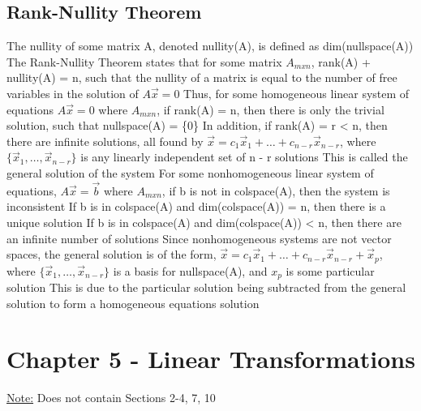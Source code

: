 \documentclass[11 pt, twoside]{article}
\newenvironment{outline*}
{
	\begin{outline}[enumerate]
	}
	{\end{outline}
}
\begin{document}
\subsection{Rank-Nullity Theorem}
\begin{outline*}
\1 The nullity of some matrix A, denoted nullity(A), is defined as dim(nullspace(A))
\1 The Rank-Nullity Theorem states that for some matrix $A_{mxn}$, rank(A) + nullity(A) = n, such that the nullity of a matrix is equal to the number of free variables in the solution of $A\vec{x} = 0$
\2 Thus, for some homogeneous linear system of equations $A\vec{x} = 0$ where $A_{mxn}$, if rank(A) = n, then there is only the trivial solution, such that nullspace(A) = \{0\}
\3 In addition, if rank(A) = r < n, then there are infinite solutions, all found by $\vec{x} = c_1\vec{x}_1 + \dots + c_{n-r}\vec{x}_{n-r}$, where $\{\vec{x}_1, \dots, \vec{x}_{n-r}\}$ is any linearly independent set of n - r solutions
\3 This is called the general solution of the system
\2 For some nonhomogeneous linear system of equations, $A\vec{x} = \vec{b}$ where $A_{mxn}$, if b is not in colspace(A), then the system is inconsistent
\3 If b is in colspace(A) and dim(colspace(A)) = n, then there is a unique solution
\3 If b is in colspace(A) and dim(colspace(A)) < n, then there are an infinite number of solutions
\3 Since nonhomogeneous systems are not vector spaces, the general solution is of the form, $\vec{x} = c_1\vec{x}_1 + \dots + c_{n-r}\vec{x}_{n-r} + \vec{x}_p$, where $\{\vec{x}_1, \dots, \vec{x}_{n-r}\}$ is a basis for nullspace(A), and $x_p$ is some particular solution
\4 This is due to the particular solution being subtracted from the general solution to form a homogeneous equations solution
\end{outline*}
\section{Chapter 5 - Linear Transformations}
\underline{Note:} Does not contain Sections 2-4, 7, 10
\end{document}
